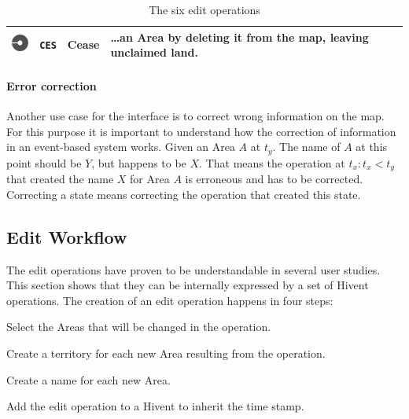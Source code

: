 \begin{table}[H]
\begin{center}
\begin{tabular}{m{0.75cm} m{0.8cm} m{2.4cm} m{9.1cm}}
  \midrule
  \vspace{0.35em}
  \raisebox{-0.35\height}
  {\includegraphics[width=0.72cm]{graphics/development/editing_hivent_data/edit_operations/CES}} &
  \texttt{CES} & Cease &
  \dots an Area by deleting it from the map, leaving unclaimed land. \\

  \bottomrule
\end{tabular}
\caption{The six edit operations}
\label{tab:edit_operations}
\end{center}
\end{table}

\paragraph{Error correction} %
\label{par:error_correction}

Another use case for the interface is to correct wrong information on the map. For this purpose it is important to understand how the correction of information in an event-based system works. Given an Area $A$ at $t_y$. The name of $A$ at this point should be $Y$, but happens to be $X$. That means the operation at $t_x: t_x < t_y$ that created the name $X$ for Area $A$ is erroneous and has to be corrected. Correcting a state means correcting the operation that created this state.



\subsection{Edit Workflow} %
\label{sub:edit_workflow}

The edit operations have proven to be understandable in several user studies. This section shows that they can be internally expressed by a set of Hivent operations. The creation of an edit operation happens in four steps:

\begin{compactenum}
  \item Select the Areas that will be changed in the operation.
  \item Create a territory for each new Area resulting from the operation.
  \item Create a name for each new Area.
  \item Add the edit operation to a Hivent to inherit the time stamp.
\end{compactenum}


